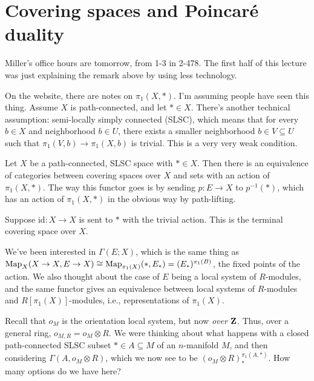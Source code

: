 \section{Covering spaces and Poincar\'{e} duality}
Miller's office hours are tomorrow, from 1-3 in 2-478. The first half of this lecture was just explaining the remark above by using less technology.

On the website, there are notes on $\pi_1(X,\ast)$. I'm assuming people have seen this thing. Assume $X$ is path-connected, and let $\ast\in X$. There's another technical assumption: semi-locally simply connected (SLSC), which means that for every $b\in X$ and neighborhood $b\in U$, there exists a smaller neighborhood $b\in V\subseteq U$ such that $\pi_1(V,b)\to\pi_1(X,b)$ is trivial. This is a very very weak condition.
\begin{theorem}
Let $X$ be a path-connected, SLSC space with $\ast\in X$. Then there is an equivalence of categories between covering spaces over $X$ and sets with an action of $\pi_1(X,\ast)$. The way this functor goes is by sending $p:E\to X$ to $p^{-1}(\ast)$, which has an action of $\pi_1(X,\ast)$ in the obvious way by path-lifting.
\end{theorem}
\begin{example}
Suppose $\mathrm{id}:X\to X$ is sent to $\ast$ with the trivial action. This is the terminal covering space over $X$.
\end{example}
We've been interested in $\Gamma(E;X)$, which is the same thing as $\operatorname{Map}_X(X\to X,E\to X)\cong\operatorname{Map}_{\pi_1(X)}(\ast,E_\ast)=(E_\ast)^{\pi_1(B)}$, the fixed points of the action. We also thought about the case of $E$ being a local system of $R$-modules, and the same functor gives an equivalence between local systems of $R$-modules and $R[\pi_1(X)]$-modules, i.e., representations of $\pi_1(X)$.

Recall that $o_M$ is the orientation local system, but now \emph{over $\mathbf Z$}. Thus, over a general ring, $o_{M,R}=o_M\otimes R$. We were thinking about what happens with a closed path-connected SLSC subset $\ast\in A\subseteq M$ of an $n$-manifold $M$, and then considering $\Gamma(A,o_M\otimes R)$, which we now see to be $(o_M\otimes R)_{\ast}^{\pi_1(A,\ast)}$. How many options do we have here?

